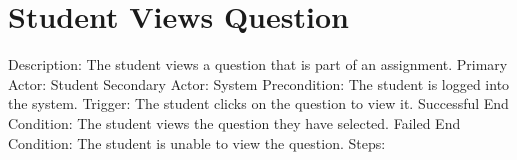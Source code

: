     \section{Student Views Question}
        Description: The student views a question that is part of an assignment. \newline
        Primary Actor: Student \newline
        Secondary Actor: System \newline
        Precondition: The student is logged into the system. \newline
        Trigger: The student clicks on the question to view it. \newline
        Successful End Condition: The student views the question they have selected. \newline
        Failed End Condition: The student is unable to view the question. \newline
        \newline
        Steps:
